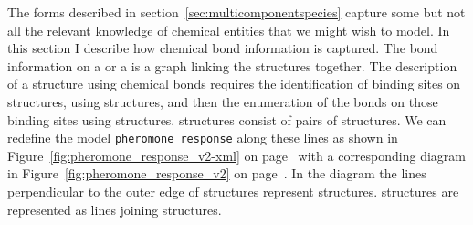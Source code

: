 \documentclass{cekarticle}
\begin{document}
The forms described in section~\ref{sec:multicomponentspecies}
capture some but not all the relevant knowledge of chemical
entities that we might wish to model.  In this section I describe
how chemical bond information is captured. The bond information on
a  or a  is a
graph linking the  structures together.
The description of a structure using chemical bonds requires the
identification of binding sites on  structures,
using  structures, and then the enumeration of
the bonds on those binding sites using 
structures.  structures consist of pairs of
 structures. We can redefine the model
\texttt{pheromone\_response} along these lines as shown in
Figure~\ref{fig:pheromone_response_v2-xml} on
page~\pageref{fig:pheromone_response_v2-xml} with a corresponding
diagram in Figure~\ref{fig:pheromone_response_v2} on
page~\pageref{fig:pheromone_response_v2}. In the diagram the lines
perpendicular to the outer edge of  structures
represent  structures. 
structures are represented as lines joining
 structures.
\end{document}
